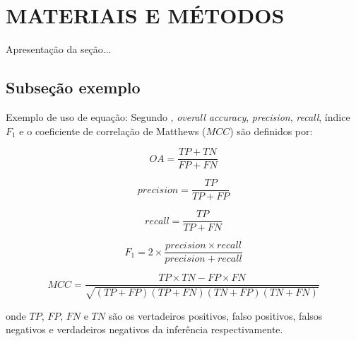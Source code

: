 \section{MATERIAIS E MÉTODOS}
\label{sec:mat_e_met}

Apresentação da seção...

\subsection{Subseção exemplo}
\label{sec:subsec_exemplo}

Exemplo de uso de equação: Segundo , \textit{overall accuracy}, \textit{precision}, \textit{recall}, índice $F_1$ e o coeficiente de correlação de Matthews ($MCC$)  são definidos por:

\begin{equation}
OA=\frac{TP+TN}{FP+FN}
\end{equation}

\begin{equation}
precision = \frac{TP}{TP+FP}
\end{equation}

\begin{equation}
recall = \frac{TP}{TP+FN}
\end{equation}

\begin{equation}
F_1 = 2 \times \frac{ precision \times recall }{precision + recall}
\end{equation}

\begin{equation}
MCC = \frac{ TP \times TN - FP \times FN } { \sqrt{(TP+FP)(TP+FN)(TN+FP)(TN+FN)} }
\end{equation}

\noindent
onde $TP$, $FP$, $FN$ e $TN$ são os vertadeiros positivos, falso positivos, falsos negativos e verdadeiros negativos da inferência respectivamente.